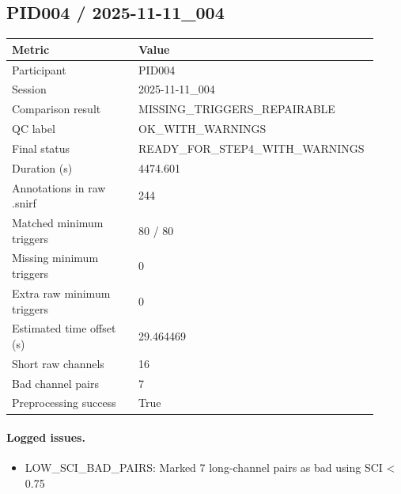 \subsection*{PID004 / 2025-11-11\_004}
\begin{tabular}{p{0.34\linewidth}p{0.58\linewidth}}
\toprule
Metric & Value\\
\midrule
Participant & PID004\\
Session & 2025-11-11\_004\\
Comparison result & MISSING\_TRIGGERS\_REPAIRABLE\\
QC label & OK\_WITH\_WARNINGS\\
Final status & READY\_FOR\_STEP4\_WITH\_WARNINGS\\
Duration (s) & 4474.601\\
Annotations in raw .snirf & 244\\
Matched minimum triggers & 80 / 80\\
Missing minimum triggers & 0\\
Extra raw minimum triggers & 0\\
Estimated time offset (s) & 29.464469\\
Short raw channels & 16\\
Bad channel pairs & 7\\
Preprocessing success & True\\
\bottomrule
\end{tabular}
\paragraph{Logged issues.}
\begin{itemize}
\item [WARNING] LOW\_SCI\_BAD\_PAIRS: Marked 7 long-channel pairs as bad using SCI < 0.75
\end{itemize}
